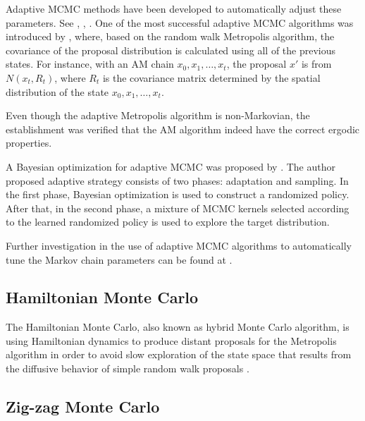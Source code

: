 
Adaptive MCMC methods have been developed to automatically adjust these parameters. See \eg \cite{andrieu2008tutorial}, \cite{atchade2009adaptive}, \cite{roberts2009examples}. One of the most successful adaptive MCMC algorithms was introduced by \cite{haario2001adaptive}, where, based on the  random walk Metropolis algorithm, the covariance of the proposal distribution is calculated using all of the previous states. For instance, with an AM chain $x_0,x_1,\ldots,x_t$, the proposal $x'$ is from $N(x_t,R_t)$, where $R_t$ is the covariance matrix determined by the spatial distribution of the state $x_0,x_1,\ldots,x_t$. 

Even though the adaptive Metropolis algorithm is non-Markovian, the establishment was verified that the AM algorithm indeed have the correct ergodic properties. 


A Bayesian optimization for adaptive MCMC was proposed by \cite{mahendran2012adaptive}. The author proposed adaptive strategy consists of two phases: adaptation and sampling. In the first phase, Bayesian optimization is used to construct a randomized policy. After that, in the second phase,  a mixture of MCMC kernels selected according to the learned randomized policy is used to explore the target distribution. 


Further investigation in the use of adaptive MCMC algorithms to automatically
tune the Markov chain parameters can be found at \cite{roberts2009examples}. 



\subsection*{Hamiltonian Monte Carlo}

The Hamiltonian Monte Carlo, also known as hybrid Monte Carlo algorithm, is using Hamiltonian dynamics to produce distant proposals for the Metropolis
algorithm in order to avoid slow exploration of the state space that results from the diffusive behavior of simple random walk proposals \cite{neal2011mcmc}. 





\subsection*{Zig-zag Monte Carlo}

